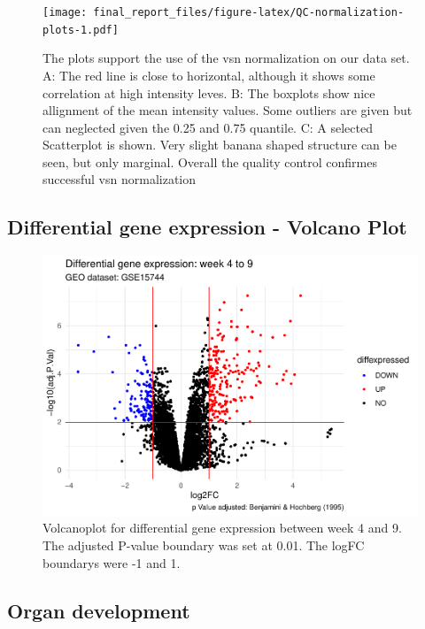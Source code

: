 \documentclass[
]{article}
\begin{document}
\begin{figure}
\centering
\texttt{[image: final\_report\_files/figure-latex/QC-normalization-plots-1.pdf]}
\caption{\label{fig:QC-normalization-plots}The plots support the use of the vsn normalization on our data set. A: The red line is close to horizontal, although it shows some correlation at high intensity leves. B: The boxplots show nice allignment of the mean intensity values. Some outliers are given but can neglected given the 0.25 and 0.75 quantile. C: A selected Scatterplot is shown. Very slight banana shaped structure can be seen, but only marginal. Overall the quality control confirmes successful vsn normalization}
\end{figure}

\hypertarget{differential-gene-expression---volcano-plot}{%
\subsection{Differential gene expression - Volcano Plot}\label{differential-gene-expression---volcano-plot}}

\begin{figure}
\centering
\includegraphics{final_report_files/figure-latex/Volcano-Plot-1.pdf}
\caption{\label{fig:Volcano-Plot}Volcanoplot for differential gene expression between week 4 and 9. The adjusted P-value boundary was set at 0.01. The logFC boundarys were -1 and 1.}
\end{figure}

\hypertarget{organ-development}{%
\subsection{Organ development}\label{organ-development}}
\end{document}
